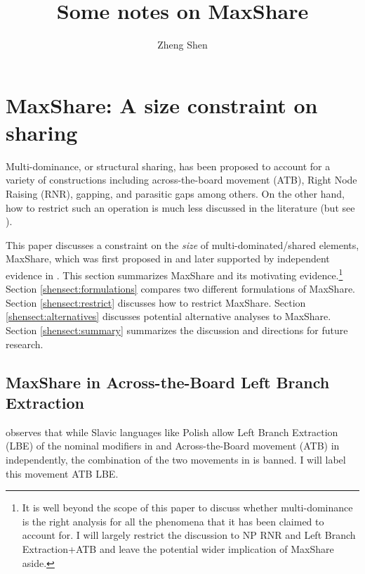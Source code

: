 \documentclass[output=paper]{langscibook}
\author{Zheng Shen\affiliation{National University of Singapore}}
\title{Some notes on MaxShare}
\begin{document}
\maketitle


\section{MaxShare: A size constraint on sharing}
\label{shensect:intro}
Multi-dominance, or structural sharing,  has been proposed to account for a variety of constructions including across-the-board movement (ATB), Right Node Raising (RNR), gapping, and  parasitic gaps among others.
On the other hand, how to restrict such an operation is much less discussed in the literature (but see \citealt{Gracanin-Yuksek:2007}). 

This paper discusses a constraint on the \textit{size} of multi-dominated/shared elements, MaxShare, which was first proposed in \citet{Citko:2006} and later supported by independent evidence in \citet{Shen:2018a}.  
This section summarizes MaxShare and its motivating evidence.\footnote{It is well beyond the scope of this paper to discuss whether multi-dominance is the right analysis for all the phenomena that it has been claimed to account for. 
I will largely restrict the discussion to NP RNR and Left Branch Extraction+ATB and leave the potential wider implication of MaxShare aside.}  
Section \ref{shensect:formulations} compares  two different formulations of MaxShare. 
Section \ref{shensect:restrict} discusses how to restrict MaxShare. 
Section \ref{shensect:alternatives} discusses potential alternative analyses to MaxShare. 
Section \ref{shensect:summary} summarizes the discussion and directions for future research.

\subsection{MaxShare in Across-the-Board Left Branch Extraction}
\label{shensect:atb}

\citet{Citko:2006} observes that while Slavic languages like Polish allow Left Branch Extraction (LBE) of the nominal modifiers in  and Across-the-Board movement (ATB) in  independently, the combination of the two movements in  is banned. I will label this movement ATB LBE.
\end{document}
